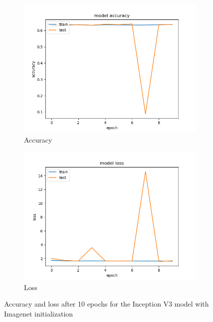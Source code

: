 \documentclass{article}
\theoremstyle{definition}
\theoremstyle{remark}
\begin{document}
\begin{figure}[h!]
\centering
\begin{subfigure}{.5\textwidth}
  \centering
  \includegraphics[width=1.2\linewidth]{img/pre-trained_models/Inception_v3_acc.png}
  \caption{Accuracy}
  \label{fig:sub1}
\end{subfigure}%
\begin{subfigure}{.5\textwidth}
  \centering
  \includegraphics[width=1.2\linewidth]{img/pre-trained_models/Inception_v3_loss.png}
  \caption{Loss}
  \label{fig:sub2}
\end{subfigure}
\caption{Accuracy and loss after 10 epochs for the Inception V3 model with Imagenet initialization}
\label{fig:inception_v3_ten_epochs_imagenet}
\end{figure}
\end{document}
